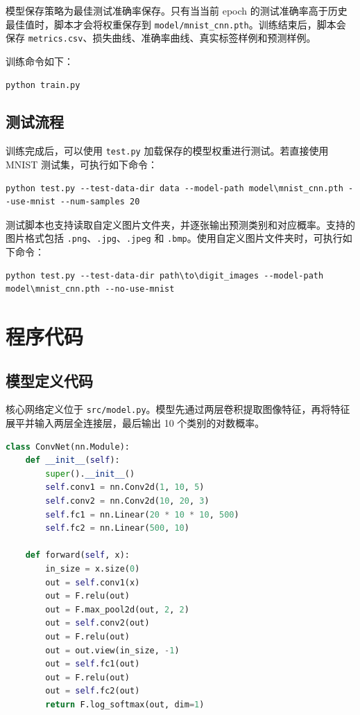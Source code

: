 \documentclass[UTF8,a4paper,10pt]{ctexart}
\begin{document}
模型保存策略为最佳测试准确率保存。只有当当前 epoch 的测试准确率高于历史最佳值时，脚本才会将权重保存到 \texttt{model/mnist\_cnn.pth}。训练结束后，脚本会保存 \texttt{metrics.csv}、损失曲线、准确率曲线、真实标签样例和预测样例。

训练命令如下：
\begin{lstlisting}[title=训练命令,frame=trbl,language={}]
python train.py
\end{lstlisting}

\subsection{测试流程}
训练完成后，可以使用 \texttt{test.py} 加载保存的模型权重进行测试。若直接使用 MNIST 测试集，可执行如下命令：
\begin{lstlisting}[title=使用 MNIST 测试集测试,frame=trbl,language={}]
python test.py --test-data-dir data --model-path model\mnist_cnn.pth --use-mnist --num-samples 20
\end{lstlisting}

测试脚本也支持读取自定义图片文件夹，并逐张输出预测类别和对应概率。支持的图片格式包括 \texttt{.png}、\texttt{.jpg}、\texttt{.jpeg} 和 \texttt{.bmp}。使用自定义图片文件夹时，可执行如下命令：
\begin{lstlisting}[title=使用图片文件夹测试,frame=trbl,language={}]
python test.py --test-data-dir path\to\digit_images --model-path model\mnist_cnn.pth --no-use-mnist
\end{lstlisting}

\section{程序代码}
\subsection{模型定义代码}
核心网络定义位于 \texttt{src/model.py}。模型先通过两层卷积提取图像特征，再将特征展平并输入两层全连接层，最后输出 10 个类别的对数概率。
\begin{lstlisting}[title=ConvNet 模型定义,frame=trbl,language={Python}]
class ConvNet(nn.Module):
    def __init__(self):
        super().__init__()
        self.conv1 = nn.Conv2d(1, 10, 5)
        self.conv2 = nn.Conv2d(10, 20, 3)
        self.fc1 = nn.Linear(20 * 10 * 10, 500)
        self.fc2 = nn.Linear(500, 10)

    def forward(self, x):
        in_size = x.size(0)
        out = self.conv1(x)
        out = F.relu(out)
        out = F.max_pool2d(out, 2, 2)
        out = self.conv2(out)
        out = F.relu(out)
        out = out.view(in_size, -1)
        out = self.fc1(out)
        out = F.relu(out)
        out = self.fc2(out)
        return F.log_softmax(out, dim=1)
\end{lstlisting}
\end{document}
